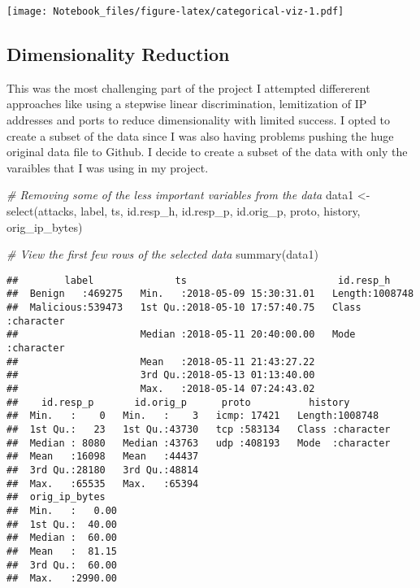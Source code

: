 \documentclass[
]{article}
\newenvironment{Shaded}{\begin{snugshade}}{\end{snugshade}}
\newcommand{\CommentTok}[1]{\textcolor[rgb]{0.56,0.35,0.01}{\textit{#1}}}
\newcommand{\FunctionTok}[1]{\textcolor[rgb]{0.00,0.00,0.00}{#1}}
\newcommand{\NormalTok}[1]{#1}
\newcommand{\OtherTok}[1]{\textcolor[rgb]{0.56,0.35,0.01}{#1}}
\begin{document}
\texttt{[image: Notebook\_files/figure-latex/categorical-viz-1.pdf]}

\hypertarget{dimensionality-reduction}{%
\subsection{Dimensionality Reduction}\label{dimensionality-reduction}}

This was the most challenging part of the project I attempted
differerent approaches like using a stepwise linear discrimination,
lemitization of IP addresses and ports to reduce dimensionality with
limited success. I opted to create a subset of the data since I was also
having problems pushing the huge original data file to Github. I decide
to create a subset of the data with only the varaibles that I was using
in my project.

\begin{Shaded}
\begin{Highlighting}[]
\CommentTok{\# Removing some of the less  important variables from the data }
\NormalTok{data1 }\OtherTok{\textless{}{-}} \FunctionTok{select}\NormalTok{(attacks, }
\NormalTok{                        label, ts, }
\NormalTok{                        id.resp\_h, id.resp\_p, id.orig\_p,}
\NormalTok{                        proto, history, orig\_ip\_bytes)}

\CommentTok{\# View the first few rows of the selected data}
\FunctionTok{summary}\NormalTok{(data1)}
\end{Highlighting}
\end{Shaded}

\begin{verbatim}
##        label              ts                          id.resp_h        
##  Benign   :469275   Min.   :2018-05-09 15:30:31.01   Length:1008748    
##  Malicious:539473   1st Qu.:2018-05-10 17:57:40.75   Class :character  
##                     Median :2018-05-11 20:40:00.00   Mode  :character  
##                     Mean   :2018-05-11 21:43:27.22                     
##                     3rd Qu.:2018-05-13 01:13:40.00                     
##                     Max.   :2018-05-14 07:24:43.02                     
##    id.resp_p       id.orig_p      proto          history         
##  Min.   :    0   Min.   :    3   icmp: 17421   Length:1008748    
##  1st Qu.:   23   1st Qu.:43730   tcp :583134   Class :character  
##  Median : 8080   Median :43763   udp :408193   Mode  :character  
##  Mean   :16098   Mean   :44437                                   
##  3rd Qu.:28180   3rd Qu.:48814                                   
##  Max.   :65535   Max.   :65394                                   
##  orig_ip_bytes    
##  Min.   :   0.00  
##  1st Qu.:  40.00  
##  Median :  60.00  
##  Mean   :  81.15  
##  3rd Qu.:  60.00  
##  Max.   :2990.00
\end{verbatim}
\end{document}
